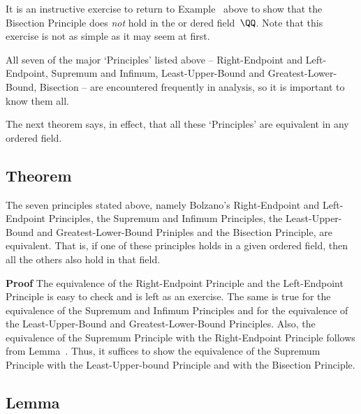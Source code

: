 \VV

        It is an instructive exercise to return to Example~ above to show that
    the Bisection Principle does {\em not} hold in the or dered field~${\QQ}$. Note that this exercise is not as simple as it may seem at first.



\VV

        All seven of the major `Principles' listed above -- Right-Endpoint and Left-Endpoint, Supremum and Infimum, Least-Upper-Bound and Greatest-Lower-Bound, Bisection
    -- are encountered frequently in analysis, so it is important to know them all.


\V

        The next theorem says, in effect, that all these `Principles' are equivalent in any ordered field.

\V

            \subsection{\small{\bf Theorem}}
            \label{ThmB30.10A}

        The seven principles stated above, namely Bolzano's Right-Endpoint and Left-Endpoint Principles, the Supremum and Infimum Principles,
    the Least-Upper-Bound and Greatest-Lower-Bound Priniples and the Bisection Principle, are equivalent.
    That is, if one of these principles holds in a given ordered field, then all the others also hold in that field.

\V

        {\bf Proof} The equivalence of the Right-Endpoint Principle and the Left-Endpoint Principle is easy to check and is left as an exercise.
    The same is true for the equivalence of the Supremum and Infimum Principles and for the equivalence of the Least-Upper-Bound and Greatest-Lower-Bound Principles.
    Also, the equivalence of the Supremum Principle with the Right-Endpoint Principle follows from Lemma~.
    Thus, it suffices to show the equivalence of the Supremum Principle with the Least-Upper-bound Principle and with the Bisection Principle.

\V

            \subsection{\small{Lemma}}
            \label{LemmaB30.08CC}

